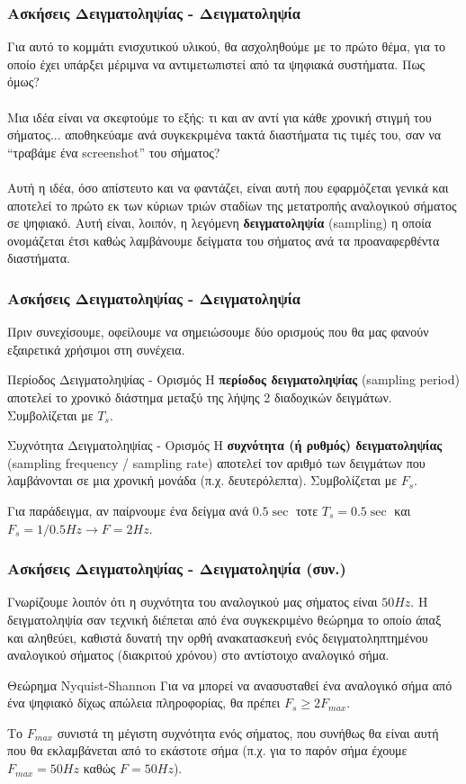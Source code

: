 \documentclass{beamer}
\begin{document}
\begin{frame}
	\frametitle{Ασκήσεις Δειγματοληψίας - Δειγματοληψία}
	Για αυτό το κομμάτι ενισχυτικού υλικού, θα ασχοληθούμε με το πρώτο θέμα, για το οποίο έχει υπάρξει μέριμνα να αντιμετωπιστεί από τα ψηφιακά συστήματα. Πως όμως? \pause 
	\\~\\ 
	Μια ιδέα είναι να σκεφτούμε το εξής: τι και αν αντί για κάθε χρονική στιγμή του σήματος... αποθηκεύαμε ανά συγκεκριμένα τακτά διαστήματα τις τιμές του, σαν να ``τραβάμε ένα \textlatin{screenshot}'' του σήματος?
	\pause \\~\\
	Αυτή η ιδέα, όσο απίστευτο και να φαντάζει, είναι αυτή που εφαρμόζεται γενικά και αποτελεί το πρώτο εκ των κύριων τριών σταδίων της μετατροπής αναλογικού σήματος σε ψηφιακό. Αυτή είναι, λοιπόν, η λεγόμενη \textbf{δειγματοληψία} (\textlatin{sampling}) η οποία ονομάζεται έτσι καθώς λαμβάνουμε δείγματα του σήματος ανά τα προαναφερθέντα διαστήματα.
	
\end{frame}
\begin{frame}
	\frametitle{Ασκήσεις Δειγματοληψίας - Δειγματοληψία}
	Πριν συνεχίσουμε, οφείλουμε να σημειώσουμε δύο ορισμούς που θα μας φανούν εξαιρετικά χρήσιμοι στη συνέχεια.
	\begin{block}{Περίοδος Δειγματοληψίας - Ορισμός}
		Η \textbf{περίοδος δειγματοληψίας} (\textlatin{sampling period}) αποτελεί το χρονικό διάστημα μεταξύ της λήψης 2 διαδοχικών δειγμάτων. Συμβολίζεται με $T_s$.
	\end{block}
		\begin{block}{Συχνότητα Δειγματοληψίας - Ορισμός}
		Η \textbf{συχνότητα (ή ρυθμός) δειγματοληψίας} (\textlatin{sampling frequency / sampling rate}) αποτελεί τον αριθμό των δειγμάτων που λαμβάνονται σε μια χρονική μονάδα (π.χ. δευτερόλεπτα). Συμβολίζεται με $F_s$.
	\end{block}
	Για παράδειγμα, αν παίρνουμε ένα δείγμα ανά $0.5\sec$ τοτε $T_s=0.5\sec$ και $F_s = 1/0.5 Hz \rightarrow F = 2 Hz$.
\end{frame}


\begin{frame}
		\frametitle{Ασκήσεις Δειγματοληψίας - Δειγματοληψία (συν.)}
	Γνωρίζουμε λοιπόν ότι η συχνότητα του αναλογικού μας σήματος είναι $50Hz$. Η δειγματοληψία σαν τεχνική διέπεται από ένα συγκεκριμένο θεώρημα το οποίο άπαξ και αληθεύει, καθιστά δυνατή την ορθή ανακατασκευή ενός δειγματοληπτημένου αναλογικού σήματος (διακριτού χρόνου) στο αντίστοιχο αναλογικό σήμα. 
	\begin{block}{Θεώρημα \textlatin{Nyquist-Shannon}}
		Για να μπορεί να ανασυσταθεί ένα αναλογικό σήμα από ένα ψηφιακό δίχως απώλεια πληροφορίας, θα πρέπει $F_s \geq 2F_{max}$.
	\end{block}
	\pause
	Το $F_{max}$ συνιστά τη μέγιστη συχνότητα ενός σήματος, που συνήθως θα είναι αυτή που θα εκλαμβάνεται από το εκάστοτε σήμα (π.χ. για το παρόν σήμα έχουμε $F_{max} = 50Hz$ καθώς $F=50Hz$).
\end{frame}
\end{document}

